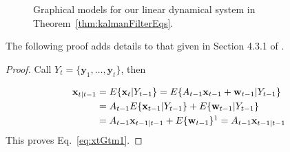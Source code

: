 \documentclass[12pt]{article}
\begin{document}
\begin{figure}
    \centering
    
    \caption{Graphical models for our linear dynamical system in
    Theorem~\ref{thm:kalmanFilterEqs}.}
    \label{fig:ldsModel}
\end{figure}

The following proof adds details to that given in Section 4.3.1 of
\citet{durbinAndKoopman12}.

\begin{proof}
    Call $Y_t=\{\mathbf{y}_1,\ldots,\mathbf{y}_t\}$, then

    \begin{align}
        \mathbf{x}_{t|t-1}&=E\{\mathbf{x}_t|Y_{t-1}\}=E\{A_{t-1}\mathbf{x}_{t-1}+\mathbf{w}_{t-1}|Y_{t-1}\}\nonumber\\
                          &=A_{t-1}E\{\mathbf{x}_{t-1}|Y_{t-1}\}+E\{\mathbf{w}_{t-1}|Y_{t-1}\}\nonumber\\
                          &=A_{t-1}\mathbf{x}_{t-1|t-1}+E\{\mathbf{w}_{t-1}\}\footnotemark[1]=A_{t-1}\mathbf{x}_{t-1|t-1}\nonumber
    \end{align}
	This proves Eq.~\ref{eq:xtGtm1}.


\end{proof}
\end{document}
